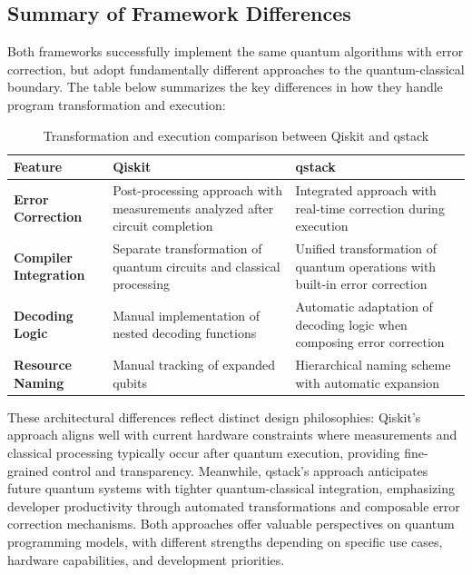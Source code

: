 \subsection{Summary of Framework Differences}

Both frameworks successfully implement the same quantum algorithms with error correction, but adopt fundamentally different approaches to the quantum-classical boundary. The table below summarizes the key differences in how they handle program transformation and execution:

\begin{table}[h]
\centering
\begin{tabular}{|p{}|p{}|p{}|}
\hline
\textbf{Feature} & \textbf{Qiskit} & \textbf{qstack} \\
\hline
\textbf{Error Correction} & Post-processing approach with measurements analyzed after circuit completion & Integrated approach with real-time correction during execution \\
\hline
\textbf{Compiler Integration} & Separate transformation of quantum circuits and classical processing & Unified transformation of quantum operations with built-in error correction \\
\hline
\textbf{Decoding Logic} & Manual implementation of nested decoding functions & Automatic adaptation of decoding logic when composing error correction \\
\hline
\textbf{Resource Naming} & Manual tracking of expanded qubits & Hierarchical naming scheme with automatic expansion \\
\hline
\end{tabular}
\caption{Transformation and execution comparison between Qiskit and qstack}
\label{fig:qstack-qiskit-comparison}
\end{table}

These architectural differences reflect distinct design philosophies: Qiskit's approach aligns well with current hardware constraints where measurements and classical processing typically occur after quantum execution, providing fine-grained control and transparency. Meanwhile, qstack's approach anticipates future quantum systems with tighter quantum-classical integration, emphasizing developer productivity through automated transformations and composable error correction mechanisms. Both approaches offer valuable perspectives on quantum programming models, with different strengths depending on specific use cases, hardware capabilities, and development priorities.

